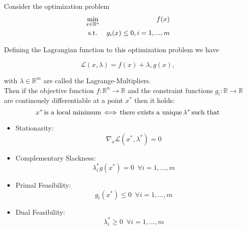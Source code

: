                     \begin{theorem}
                        Consider the optimization problem
                        \begin{eqnarray}
                            \min_{x \in \mathbb{R}^{n}} &&f(x) \notag \\
                            \textnormal{s.t.} \,\, && g_{i}(x) \le 0, i = 1, ..., m \notag
                        \end{eqnarray}

                        Defining the Lagrangian function to this optimization problem we have

                        \begin{equation}
                            \mathcal{L}(x, \lambda) = f(x) + \lambda, g(x),
                        \end{equation}

                        with $\lambda \in \mathbb{R}^{m}$ are called the Lagrange-Multipliers.\\

                        Then if the objective function $f: \mathbb{R}^{n} \longrightarrow \mathbb{R}$ and the constraint functions $g_{i}: \mathbb{R} \longrightarrow \mathbb{R}$ are continously differentiable at a point $x^{*}$ then it holds:\\
                        $$x^{*} \, \textnormal{is a local minimum} \, \Longleftrightarrow \, \textnormal{there exists a unique} \, \lambda^{*} \, \textnormal{such that}$$
                        \begin{itemize}
                            \item Stationarity:
                            $$\nabla_{x} \mathcal{L}(x^{*}, \lambda^{*}) = 0$$
                            \item Complementary Slackness:
                            $$\lambda^{*}_{i} g(x^{*}) = 0 \, \, \, \forall i = 1, ..., m$$
                            \item Primal Feasibility:
                            $$g_{i}(x^{*}) \le 0 \, \, \, \forall i = 1, ..., m$$
                            \item Dual Feasibility:
                            $$\lambda^{*}_{i} \ge 0 \, \, \, \forall i = 1, ..., m$$
                        \end{itemize}
                    \end{theorem}

